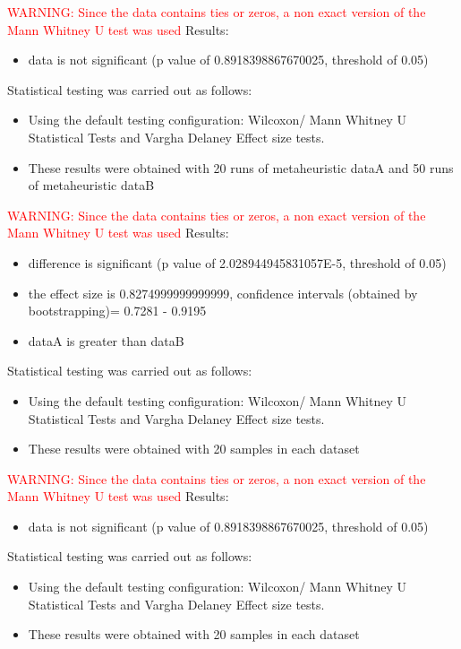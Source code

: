 \documentclass[]{article}
\begin{document}
\textcolor{Red}{WARNING: Since the data contains ties or zeros, a non exact version of the Mann Whitney U test was used
}
Results:
\begin{itemize}
\item{data is not significant (p value of 0.8918398867670025, threshold of 0.05)}
\end{itemize}Statistical testing was carried out as follows: \begin{itemize}
\item{Using the default testing configuration: Wilcoxon/ Mann Whitney U Statistical Tests and Vargha Delaney Effect size tests.}
\item{These results were obtained with 20 runs of metaheuristic dataA and 50 runs of metaheuristic dataB}
\end{itemize}
\textcolor{Red}{WARNING: Since the data contains ties or zeros, a non exact version of the Mann Whitney U test was used
}
Results:
\begin{itemize}
\item{difference is significant (p value of 2.028944945831057E-5, threshold of 0.05)}
\item{the effect size is 0.8274999999999999, confidence intervals (obtained by bootstrapping)= 0.7281 - 0.9195}
\item{dataA is greater than dataB}
\end{itemize}Statistical testing was carried out as follows: \begin{itemize}
\item{Using the default testing configuration: Wilcoxon/ Mann Whitney U Statistical Tests and Vargha Delaney Effect size tests.}
\item{These results were obtained with 20 samples in each dataset}
\end{itemize}
\textcolor{Red}{WARNING: Since the data contains ties or zeros, a non exact version of the Mann Whitney U test was used
}
Results:
\begin{itemize}
\item{data is not significant (p value of 0.8918398867670025, threshold of 0.05)}
\end{itemize}Statistical testing was carried out as follows: \begin{itemize}
\item{Using the default testing configuration: Wilcoxon/ Mann Whitney U Statistical Tests and Vargha Delaney Effect size tests.}
\item{These results were obtained with 20 samples in each dataset}
\end{itemize}
\end{document}
